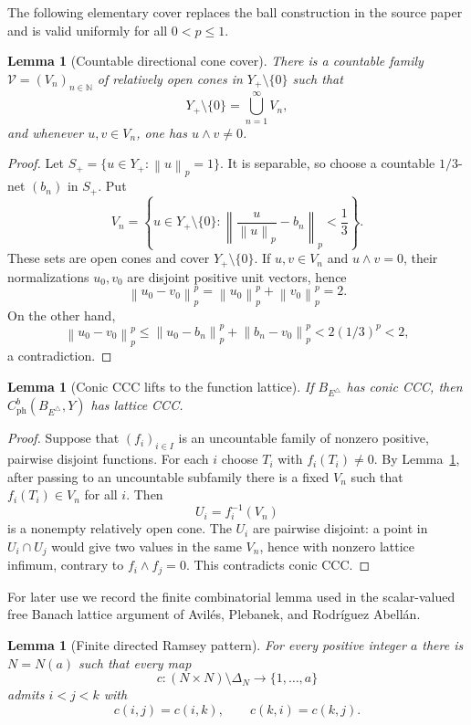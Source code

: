 \documentclass[11pt]{article}
\newtheorem{lemma}[theorem]{Lemma}
\theoremstyle{definition}
\newcommand{\N}{\mathbb N}
\newcommand{\cph}{C_{\mathrm{ph}}^b}
\newcommand{\calV}{\mathcal V}
\newcommand{\norm}[1]{\left\lVert #1\right\rVert}
\begin{document}
The following elementary cover replaces the ball construction in the source
paper and is valid uniformly for all $0<p\leq1$.

\begin{lemma}[Countable directional cone cover]
\label{lem:cone-cover}
There is a countable family $\calV=(V_n)_{n\in\N}$ of relatively open cones in
$Y_+\setminus\{0\}$ such that
\[
 Y_+\setminus\{0\}=\bigcup_{n=1}^\infty V_n,
\]
and whenever $u,v\in V_n$, one has $u\wedge v\neq0$.
\end{lemma}

\begin{proof}
Let $S_+=\{u\in Y_+:\norm{u}_p=1\}$.  It is separable, so choose a countable
$1/3$-net $(b_n)$ in $S_+$.  Put
\[
 V_n=\left\{u\in Y_+\setminus\{0\}:
 \norm{\frac{u}{\norm{u}_p}-b_n}_p<\frac13\right\}.
\]
These sets are open cones and cover $Y_+\setminus\{0\}$.  If $u,v\in V_n$ and
$u\wedge v=0$, their normalizations $u_0,v_0$ are disjoint positive unit
vectors, hence
\[
 \norm{u_0-v_0}_p^p=\norm{u_0}_p^p+\norm{v_0}_p^p=2.
\]
On the other hand,
\[
 \norm{u_0-v_0}_p^p
 \leq \norm{u_0-b_n}_p^p+\norm{b_n-v_0}_p^p
 <2(1/3)^p<2,
\]
a contradiction.
\end{proof}

\begin{lemma}[Conic CCC lifts to the function lattice]
\label{lem:conic-lift}
If $B_{E^\triangle}$ has conic CCC, then
$\cph(B_{E^\triangle},Y)$ has lattice CCC.
\end{lemma}

\begin{proof}
Suppose that $(f_i)_{i\in I}$ is an uncountable family of nonzero positive,
pairwise disjoint functions.  For each $i$ choose $T_i$ with $f_i(T_i)\neq0$.
By Lemma~\ref{lem:cone-cover}, after passing to an uncountable subfamily there
is a fixed $V_n$ such that $f_i(T_i)\in V_n$ for all $i$.  Then
\[
 U_i=f_i^{-1}(V_n)
\]
is a nonempty relatively open cone.  The $U_i$ are pairwise disjoint: a point
in $U_i\cap U_j$ would give two values in the same $V_n$, hence with nonzero
lattice infimum, contrary to $f_i\wedge f_j=0$.  This contradicts conic CCC.
\end{proof}

For later use we record the finite combinatorial lemma used in the scalar-valued
free Banach lattice argument of Avil\'es, Plebanek, and Rodr\'iguez Abell\'an.

\begin{lemma}[Finite directed Ramsey pattern]
\label{lem:ramsey}
For every positive integer $a$ there is $N=N(a)$ such that every map
\[
 c:(N\times N)\setminus\Delta_N\longrightarrow\{1,\ldots,a\}
\]
admits $i<j<k$ with
\[
 c(i,j)=c(i,k),\qquad c(k,i)=c(k,j).
\]
\end{lemma}
\end{document}
